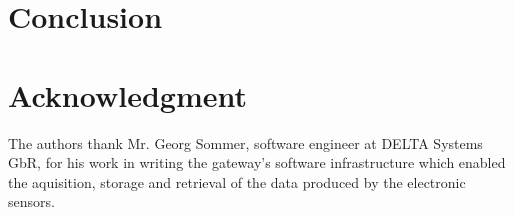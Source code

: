 \documentclass[conference]{IEEEtran}
\begin{document}
\section{Conclusion}
\label{sec_conclusion}

\section*{Acknowledgment}
The authors thank Mr. Georg Sommer, software engineer at DELTA Systems GbR, for his work in writing the gateway's software infrastructure which enabled the aquisition, storage and retrieval of the data produced by the electronic sensors.

\end{document}
